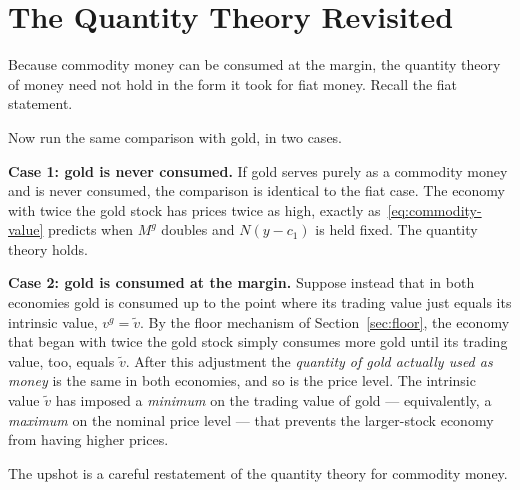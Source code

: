 \section{The Quantity Theory Revisited}

Because commodity money can be consumed at the margin, the quantity theory of money need not hold in the form it took for fiat money. Recall the fiat statement.


Now run the same comparison with gold, in two cases.

\textbf{Case 1: gold is never consumed.} If gold serves purely as a commodity money and is never consumed, the comparison is identical to the fiat case. The economy with twice the gold stock has prices twice as high, exactly as~\eqref{eq:commodity-value} predicts when $M^g$ doubles and $N(y-c_1)$ is held fixed. The quantity theory holds.

\textbf{Case 2: gold is consumed at the margin.} Suppose instead that in both economies gold is consumed up to the point where its trading value just equals its intrinsic value, $v^g = \tilde v$. By the floor mechanism of Section~\ref{sec:floor}, the economy that began with twice the gold stock simply consumes more gold until its trading value, too, equals $\tilde v$. After this adjustment the \emph{quantity of gold actually used as money} is the same in both economies, and so is the price level. The intrinsic value $\tilde v$ has imposed a \emph{minimum} on the trading value of gold --- equivalently, a \emph{maximum} on the nominal price level --- that prevents the larger-stock economy from having higher prices.

The upshot is a careful restatement of the quantity theory for commodity money.


